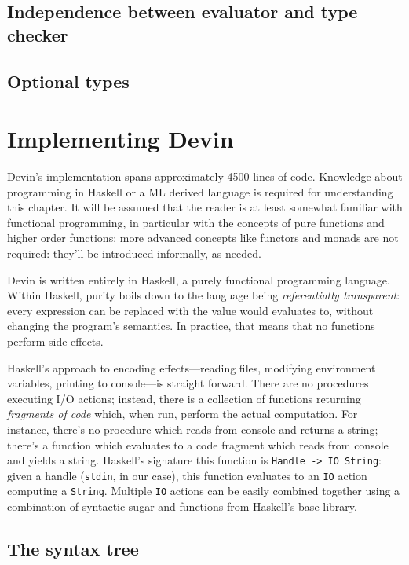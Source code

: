 \documentclass[11pt, american, draft]{PhdThesis}
\begin{document}
  \section{Independence between evaluator and type checker}

  \section{Optional types}

  \chapter{Implementing Devin}

  Devin's implementation spans approximately 4500 lines of code. Knowledge about programming in
  Haskell or a ML derived language is required for understanding this chapter. It will be assumed
  that the reader is at least somewhat familiar with functional programming, in particular with the
  concepts of pure functions and higher order functions; more advanced concepts like functors and
  monads are not required: they'll be introduced informally, as needed.

  Devin is written entirely in Haskell, a purely functional programming language. Within Haskell,
  purity boils down to the language being \emph{referentially transparent}: every expression can
  be replaced with the value would evaluates to, without changing the program's semantics. In
  practice, that means that no functions perform side-effects.

  Haskell's approach to encoding effects---reading files, modifying environment variables, printing
  to console---is straight forward. There are no procedures executing I/O actions; instead, there
  is a collection of functions returning \emph{fragments of code} which, when run, perform the
  actual computation. For instance, there's no procedure which reads from console and returns a
  string; there's a function which evaluates to a code fragment which reads from console and yields
  a string. Haskell's signature this function is \verb$Handle -> IO String$: given a handle
  (\verb$stdin$, in our case), this function evaluates to an \verb$IO$ action computing a
  \verb$String$. Multiple \verb$IO$ actions can be easily combined together using a combination of
  syntactic sugar and functions from Haskell's base library.

  \section{The syntax tree}
\end{document}
